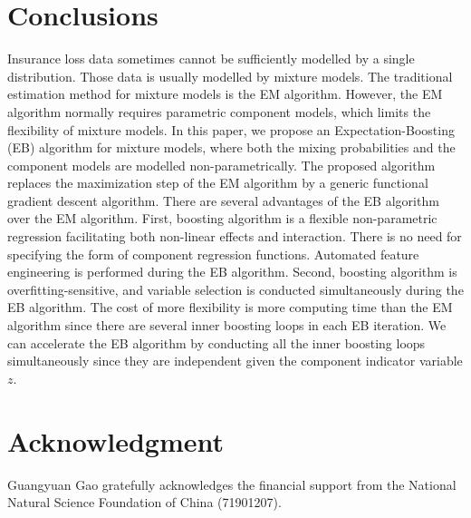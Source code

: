 \documentclass[11pt]{article}
\numberwithin{equation}{section}
\begin{document}
\section{Conclusions}\label{sec:conclusions}
Insurance loss data sometimes cannot be sufficiently modelled by a single distribution.
Those data is usually modelled by mixture models.
The traditional estimation method for mixture models is the EM algorithm.
However, the EM algorithm normally requires parametric component models, which limits the flexibility of mixture models.
In this paper, we propose an Expectation-Boosting (EB) algorithm for mixture models, where both the mixing probabilities and the component models are modelled non-parametrically. 
The proposed algorithm replaces the maximization step of the EM algorithm by a generic functional gradient descent algorithm.
There are several advantages of the EB algorithm over the EM algorithm. 
First, boosting algorithm is a flexible non-parametric regression facilitating both {non-linear effects and interaction}.  
There is no need for specifying the form of component regression functions.
Automated feature engineering is performed during the EB algorithm.
Second, boosting algorithm is {overfitting-sensitive}, and {variable selection} is conducted simultaneously during the EB algorithm.
The cost of more flexibility is more computing time than the EM algorithm since there are several inner boosting loops in each EB iteration.
We can accelerate the EB algorithm by conducting all the inner boosting loops simultaneously since they are independent given the component indicator variable $z$.

	\section*{Acknowledgment}
Guangyuan Gao gratefully acknowledges the financial support from the National Natural Science Foundation of China (71901207). 



\end{document}
